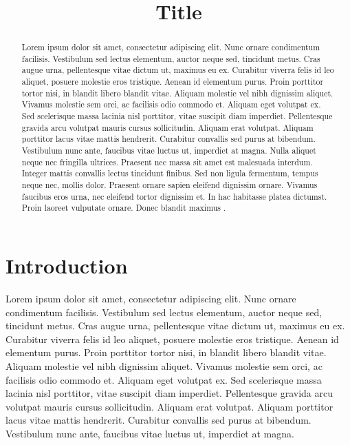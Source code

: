\documentclass[conference]{IEEEtran}
\begin{document}
\title{Title}
\author{
}


\maketitle

\begin{abstract} %
Lorem ipsum dolor sit amet, consectetur adipiscing elit. Nunc ornare condimentum facilisis. Vestibulum sed lectus elementum, auctor neque sed, tincidunt metus. Cras augue urna, pellentesque vitae dictum ut, maximus eu ex. Curabitur viverra felis id leo aliquet, posuere molestie eros tristique. Aenean id elementum purus. Proin porttitor tortor nisi, in blandit libero blandit vitae. Aliquam molestie vel nibh dignissim aliquet. Vivamus molestie sem orci, ac facilisis odio commodo et. Aliquam eget volutpat ex. Sed scelerisque massa lacinia nisl porttitor, vitae suscipit diam imperdiet. Pellentesque gravida arcu volutpat mauris cursus sollicitudin. Aliquam erat volutpat. Aliquam porttitor lacus vitae mattis hendrerit. Curabitur convallis sed purus at bibendum. Vestibulum nunc ante, faucibus vitae luctus ut, imperdiet at magna.
Nulla aliquet neque nec fringilla ultrices. Praesent nec massa sit amet est malesuada interdum. Integer mattis convallis lectus tincidunt finibus. Sed non ligula fermentum, tempus neque nec, mollis dolor. Praesent ornare sapien eleifend dignissim ornare. Vivamus faucibus eros urna, nec eleifend tortor dignissim et. In hac habitasse platea dictumst. Proin laoreet vulputate ornare. Donec blandit maximus \cite{Brindley2010}.
\end{abstract}

\section{Introduction} %
Lorem ipsum dolor sit amet, consectetur adipiscing elit. Nunc ornare condimentum facilisis. Vestibulum sed lectus elementum, auctor neque sed, tincidunt metus. Cras augue urna, pellentesque vitae dictum ut, maximus eu ex. Curabitur viverra felis id leo aliquet, posuere molestie eros tristique. Aenean id elementum purus. Proin porttitor tortor nisi, in blandit libero blandit vitae. Aliquam molestie vel nibh dignissim aliquet. Vivamus molestie sem orci, ac facilisis odio commodo et. Aliquam eget volutpat ex. Sed scelerisque massa lacinia nisl porttitor, vitae suscipit diam imperdiet. Pellentesque gravida arcu volutpat mauris cursus sollicitudin. Aliquam erat volutpat. Aliquam porttitor lacus vitae mattis hendrerit. Curabitur convallis sed purus at bibendum. Vestibulum nunc ante, faucibus vitae luctus ut, imperdiet at magna.
\end{document}
